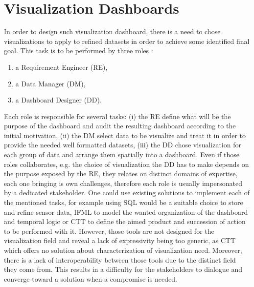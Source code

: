 \documentclass{acm_proc_article-sp}
\begin{document}
\section{Visualization Dashboards}
In order to design such visualization dashboard, there is a need to chose
visualizations to apply to refined datasets in order to achieve some
identified final goal. This task is to be performed by three roles :
\begin{enumerate}
\item a Requirement Engineer (RE),
\item a Data Manager (DM),
\item  a Dashboard Designer (DD).
\end{enumerate}
Each role is responsible for several tasks:
(i) the RE define what will be the purpose of the dashboard and audit the
resulting dashboard according to the initial motivation,
(ii) the DM select data to be visualize and treat it in order to provide
the needed well formatted datasets,
(iii) the DD chose visualization for each group of data and arrange them
spatially into a dashboard.
Even if those roles collaborates, e.g. the choice of visualization the DD has
to make depends on the purpose exposed by the RE, they relates on distinct
domains of expertise, each one bringing is own challenges, therefore each role
is usually impersonated by a dedicated stakeholder.
One could use existing solutions to implement each of the mentioned tasks, for
example using SQL would be a suitable choice to store and refine
sensor data, IFML to model the wanted organization of the dashboard
and temporal logic or CTT to define the aimed product and succession of action
to be performed with it.
However, those tools are not designed for the visualization field and reveal a
lack of expressivity being too generic, as CTT which offers no solution about
characterization of visualization need.
Moreover, there is a lack of interoperability between those tools due to the
distinct field they come from. This results in a difficulty for the stakeholders
to dialogue and converge toward a solution when a compromise is needed.
\end{document}
